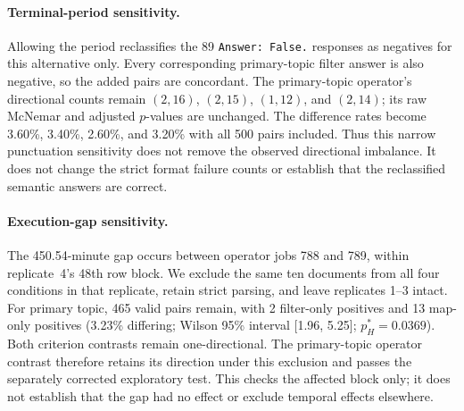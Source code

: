 \documentclass[11pt]{article}
\begin{document}
\paragraph{Terminal-period sensitivity.}
Allowing the period reclassifies the 89 \texttt{Answer: False.} responses as
negatives for this alternative only. Every corresponding primary-topic
filter answer is also negative, so the added pairs are concordant. The
primary-topic operator's directional counts remain $(2,16)$, $(2,15)$,
$(1,12)$, and $(2,14)$; its raw McNemar and adjusted $p$-values are unchanged.
The difference rates become 3.60\%, 3.40\%, 2.60\%, and 3.20\% with all
500 pairs included. Thus this narrow punctuation sensitivity does not remove
the observed directional imbalance. It does not change the strict format
failure counts or establish that the reclassified semantic answers are correct.

\paragraph{Execution-gap sensitivity.}
The 450.54-minute gap occurs between operator jobs 788 and 789, within
replicate~4's 48th row block. We exclude the same ten documents from all four
conditions in that replicate, retain strict parsing, and leave replicates
1--3 intact. For primary topic, 465 valid pairs remain, with 2 filter-only
positives and 13 map-only positives (3.23\% differing; Wilson 95\% interval
[1.96, 5.25]; $p_H^*=0.0369$). Both criterion contrasts remain
one-directional. The primary-topic operator contrast therefore retains its
direction under this exclusion and passes the separately corrected
exploratory test. This checks the affected block only; it does not establish
that the gap had no effect or exclude temporal effects elsewhere.
\end{document}
